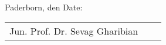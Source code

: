\vspace*{.5cm}
\ifgerman
Paderborn, den
\else
Date:
\fi
\vspace*{1cm}
\begin{center}
	\begin{tabular}{l p{} r}
	  \cline{1-1} \cline{3-3}
	  \begin{minipage}[t]{0.4\textwidth}
	    \centering
	    Jun. Prof. Dr. Sevag Gharibian
		\end{minipage}
		&
		\begin{minipage}[t]{0.2\textwidth}
		\end{minipage}
		&
		\begin{minipage}[t]{0.4\textwidth}
		  \centering
		  \Author
		\end{minipage}
	\end{tabular}
\end{center}